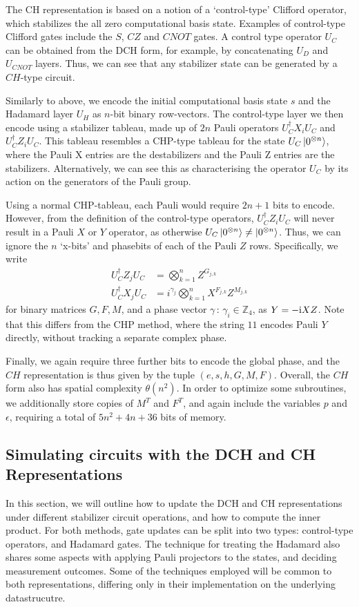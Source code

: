 The CH representation is based on a notion of a `control-type' Clifford operator, which stabilizes the all zero computational basis state. Examples of control-type Clifford gates include the $S$, $CZ$ and $CNOT$ gates. A control type operator $U_{C}$ can be obtained from the DCH form, for example, by concatenating $U_{D}$ and $U_{CNOT}$ layers. Thus, we can see that any stabilizer state can be generated by a $CH$-type circuit.\par
Similarly to above, we encode the initial computational basis state $s$ and the Hadamard layer $U_{H}$ as $n$-bit binary row-vectors. The control-type layer we then encode using a stabilizer tableau, made up of $2n$ Pauli operators
$U_{C}^{\dagger}X_{i}U_{C}$ and $U_{C}^{\dagger}Z_{i}U_{C}$. This tableau resembles a CHP-type tableau for the state $U_{C}\ket{0^{\otimes n}}$, where the Pauli X entries are the destabilizers and the Pauli Z entries are the stabilizers. Alternatively, we can see this as characterising the operator $U_{C}$ by its action on the generators of the Pauli group.\par
Using a normal CHP-tableau, each Pauli would require $2n+1$ bits to encode. However, from the definition of the control-type operators, $U_{C}^{\dagger}Z_{i}U_{C}$ will never result in a Pauli $X$ or $Y$ operator, as otherwise $U_{C}\ket{0^{\otimes n}}\neq\ket{0^{\otimes n}}$. Thus, we can ignore the $n$ `x-bits' and phasebits of each of the Pauli $Z$ rows. Specifically, we write
\begin{align}
U_{C}^{\dagger}Z_{j}U_{C} &= \bigotimes_{k=1}^{n} Z^{G_{j,k}} \\
U_{C}^{\dagger}X_{j}U_{C} &= i^{\gamma_{j}}\bigotimes_{k=1}^{n}X^{F_{j,k}}Z^{M_{j,k}}
\end{align}
for binary matrices $G, F, M$, and a phase vector $\gamma\,:\,\gamma_{i}\in\mathbb{Z}_{4}$, as $Y=-\mathrm{i} XZ$. Note that this differs from the CHP method, where the string $11$ encodes Pauli $Y$ directly, without tracking a separate complex phase.\par
Finally, we again require three further bits to encode the global phase, and the $CH$ representation is thus given by the tuple $(e, s, h, G, M, F)$. Overall, the $CH$ form  also has spatial complexity $\theta(n^{2})$.  In order to optimize some subroutines, we additionally store copies of $M^{T}$ and $F^{T}$, and again include the variables $p$ and $\epsilon$,  requiring a total of $5n^{2}+4n+36$ bits of memory.
\subsection{Simulating circuits with the DCH and CH Representations}
In this section, we will outline how to update the DCH and CH representations under different stabilizer circuit operations, and how to compute the inner product. For both methods, gate updates can be split into two types: control-type operators, and Hadamard gates. The technique for treating the Hadamard also shares some aspects with applying Pauli projectors to the states, and deciding measurement outcomes. Some of the techniques employed will be common to both representations, differing only in their implementation on the underlying datastrucutre.
